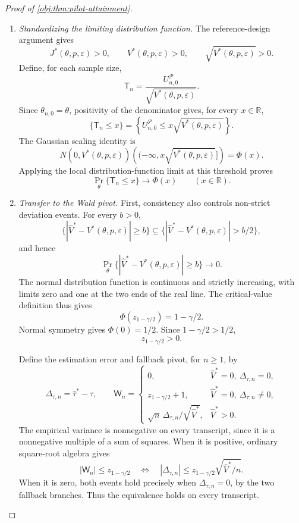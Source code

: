 \begin{proof}[Proof of \cref{obj:thm:pilot-attainment}]
\begin{enumerate}
\item \emph{Standardizing the limiting distribution function.}
The reference-design argument gives
\[
J^*(\theta,p,\varepsilon)>0,
\qquad
V^*(\theta,p,\varepsilon)>0,
\qquad
\sqrt{V^*(\theta,p,\varepsilon)}>0.
\]
Define, for each sample size,
\[
\mathsf T_n
=\frac{U_{n,0}^{\mathcal P}}
{\sqrt{V^*(\theta,p,\varepsilon)}}.
\]
Since \(\theta_{n,0}=\theta\), positivity of the denominator gives, for every \(x\in\mathbb R\),
\[
\{\mathsf T_n\le x\}
=
\left\{U_{n,0}^{\mathcal P}
\le x\sqrt{V^*(\theta,p,\varepsilon)}\right\}.
\]
The Gaussian scaling identity is
\[
N(0,V^*(\theta,p,\varepsilon))
\left((-\infty,x\sqrt{V^*(\theta,p,\varepsilon)}]\right)
=\Phi(x).
\]
Applying the local distribution-function limit at this threshold proves
\[
\Pr_\theta\{\mathsf T_n\le x\}\longrightarrow\Phi(x)
\qquad(x\in\mathbb R).
\]

\item \emph{Transfer to the Wald pivot.}
First, consistency also controls non-strict deviation events. For every \(b>0\),
\[
\{|\widehat V^*-V^*(\theta,p,\varepsilon)|\ge b\}
\subseteq
\{|\widehat V^*-V^*(\theta,p,\varepsilon)|>b/2\},
\]
and hence
\[
\Pr_\theta\{|\widehat V^*-V^*(\theta,p,\varepsilon)|\ge b\}
\longrightarrow0.
\]
The normal distribution function is continuous and strictly increasing, with limits zero and one at the two ends of the real line. The critical-value definition thus gives
\[
\Phi(z_{1-\gamma/2})=1-\gamma/2.
\]
Normal symmetry gives \(\Phi(0)=1/2\). Since \(1-\gamma/2>1/2\),
\[
z_{1-\gamma/2}>0.
\]

Define the estimation error and fallback pivot, for \(n\ge1\), by
\[
\Delta_{\tau,n}=\widehat\tau^*-\tau,
\qquad
\mathsf W_n=
\begin{cases}
0,&\widehat V^*=0,\ \Delta_{\tau,n}=0,\\
z_{1-\gamma/2}+1,&\widehat V^*=0,\ \Delta_{\tau,n}\ne0,\\
\sqrt n\,\Delta_{\tau,n}/\sqrt{\widehat V^*},
&\widehat V^*>0.
\end{cases}
\]
The empirical variance is nonnegative on every transcript, since it is a nonnegative multiple of a sum of squares. When it is positive, ordinary square-root algebra gives
\[
|\mathsf W_n|\le z_{1-\gamma/2}
\quad\Longleftrightarrow\quad
|\Delta_{\tau,n}|
\le z_{1-\gamma/2}\sqrt{\widehat V^*/n}.
\]
When it is zero, both events hold precisely when \(\Delta_{\tau,n}=0\), by the two fallback branches. Thus the equivalence holds on every transcript.


\end{enumerate}
\end{proof}
